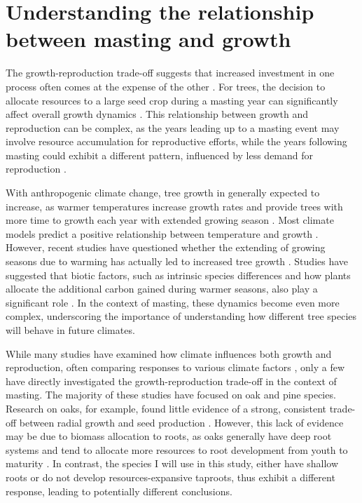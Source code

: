 \documentclass[11pt,letter]{article}
\begin{document}
\section{Understanding the relationship between masting and growth}
The growth-reproduction trade-off suggests that increased investment in one process often comes at the expense of the other \citep{grime1977evidence, stearns1998evolution}. For trees, the decision to allocate resources to a large seed crop during a masting year can significantly affect overall growth dynamics \citep{hacket2016tree}. This relationship between growth and reproduction can be complex, as the years leading up to a masting event may involve resource accumulation for reproductive efforts, while the years following masting could exhibit a different pattern, influenced by less demand for reproduction \citep{kelly1994evolutionary}.\par
With anthropogenic climate change, tree growth in generally expected to increase, as warmer temperatures increase growth rates and provide trees with more time to growth each year with extended growing season \citep{keenan2014net, finzi2020carbon}. Most climate models predict a positive relationship between temperature and growth \citep{friedlingstein2022global, ito2020global}. However, recent studies have questioned whether the extending of growing seasons due to warming has actually led to increased tree growth \citep{dow2022warm, green2022limits}. Studies have suggested that biotic factors, such as intrinsic species differences and how plants allocate the additional carbon gained during warmer seasons, also play a significant role \citep{hacket2016consistent}. In the context of masting,  these dynamics become even more complex, underscoring the importance of understanding how different tree species will behave in future climates.\par
While many studies have examined how climate influences both growth and reproduction, often comparing responses to various climate factors \citep{bajocco2021characterizing, koenig2020can, redmond2019resource, sanchez2011trade}, only a few have directly investigated the growth-reproduction trade-off in the context of masting. The majority of these studies have focused on oak and pine species. Research on oaks, for example, found little evidence of a strong, consistent trade-off between radial growth and seed production \citep{koenig2020can, patterson2023acorn}. However, this lack of evidence may be due to biomass allocation to roots, as oaks generally have deep root systems and tend to allocate more resources to root development from youth to maturity \citep{burns1990silvics}. In contrast, the species I will use in this study, either have shallow roots or do not develop resources-expansive taproots, thus exhibit a different response, leading to potentially different conclusions.\par
\end{document}
